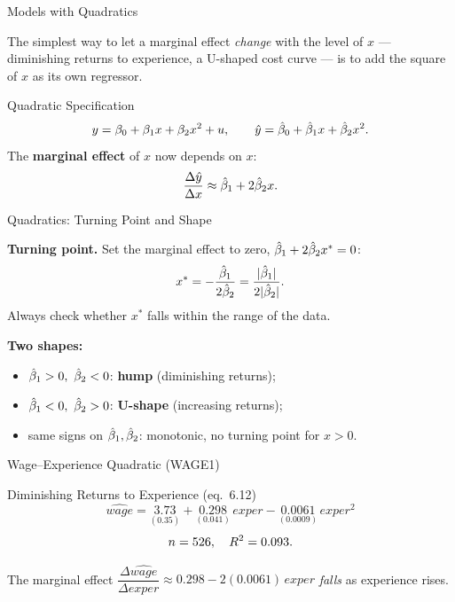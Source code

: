 \documentclass[aspectratio=169, 12pt]{beamer}
\begin{document}
\begin{frame}{Models with Quadratics}

  The simplest way to let a marginal effect \emph{change} with the level of $x$ ---
  diminishing returns to experience, a U-shaped cost curve --- is to add the square
  of $x$ as its own regressor.

  \begin{definitionbox}{Quadratic Specification}
    \[
      y = \beta_0 + \beta_1 x + \beta_2 x^2 + u, \qquad
      \hat{y} = \hat{\beta}_0 + \hat{\beta}_1 x + \hat{\beta}_2 x^2 .
    \]
    The \textbf{marginal effect} of $x$ now depends on $x$:
    \[
      \frac{\Delta \hat{y}}{\Delta x} \approx \hat{\beta}_1 + 2\hat{\beta}_2 x .
    \]
  \end{definitionbox}

\end{frame}

\begin{frame}{Quadratics: Turning Point and Shape}

  \begin{keybox}
    \textbf{Turning point.} Set the marginal effect to zero,
    $\hat{\beta}_1 + 2\hat{\beta}_2 x^* = 0$:
    \[
      x^* = -\frac{\hat{\beta}_1}{2\hat{\beta}_2} = \frac{|\hat{\beta}_1|}{2|\hat{\beta}_2|} .
    \]
    Always check whether $x^*$ falls within the range of the data.
  \end{keybox}

  \medskip

  \textbf{Two shapes:}
  \begin{itemize}
    \item $\hat{\beta}_1 > 0,\ \hat{\beta}_2 < 0$: \textbf{hump} (diminishing returns);
    \item $\hat{\beta}_1 < 0,\ \hat{\beta}_2 > 0$: \textbf{U-shape} (increasing returns);
    \item same signs on $\hat{\beta}_1,\hat{\beta}_2$: monotonic, no turning point for $x > 0$.
  \end{itemize}

\end{frame}

\begin{frame}{Wage--Experience Quadratic (WAGE1)}

  \begin{examplebox}{Diminishing Returns to Experience (eq.\ 6.12)}
    \[
      \widehat{wage} = \underset{(0.35)}{3.73}
        + \underset{(0.041)}{0.298}\, exper
        - \underset{(0.0009)}{0.0061}\, exper^2
    \]
    \[
      n = 526, \quad R^2 = 0.093 .
    \]
  \end{examplebox}

  \medskip

  The marginal effect
  $\dfrac{\Delta \widehat{wage}}{\Delta exper} \approx 0.298 - 2(0.0061)\, exper$
  \emph{falls} as experience rises.

\end{frame}
\end{document}

